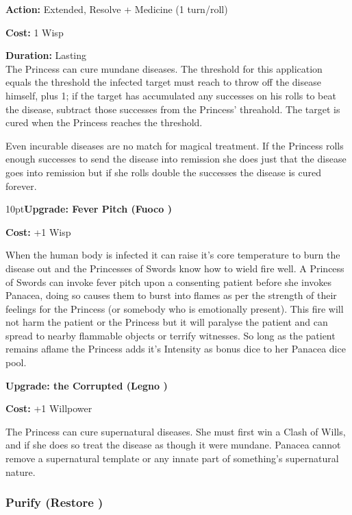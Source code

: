 \noindent \textbf{Action:} Extended, Resolve + Medicine (1 turn/roll)

\noindent \textbf{Cost:} 1 Wisp

\noindent \textbf{Duration:} Lasting \\

\noindent The Princess can cure mundane diseases. The threshold for this application equals the threshold the infected target must reach to throw off the disease himself, plus 1; if the target has accumulated any successes on his rolls to beat the disease, subtract those successes from the Princess' threahold. The target is cured when the Princess reaches the threshold.

Even incurable diseases are no match for magical treatment. If the Princess rolls enough successes to send the disease into remission she does just that \textemdash the disease goes into remission \textemdash but if she rolls double the successes the disease is cured forever. 

\begin{myindentpar}{10pt}\textbf{Upgrade: Fever Pitch (Fuoco \textbullet\textbullet)}

\noindent \textbf{Cost:} +1 Wisp

When the human body is infected it can raise it's core temperature to burn the disease out and the Princesses of Swords know how to wield fire well. A Princess of Swords can invoke fever pitch upon a consenting patient before she invokes Panacea, doing so causes them to burst into flames as per the strength of their feelings for the Princess (or somebody who is emotionally present). This fire will not harm the patient or the Princess but it will paralyse the patient and can spread to nearby flammable objects or terrify witnesses. So long as the patient remains aflame the Princess adds it's Intensity as bonus dice to her Panacea dice pool. 

\textbf{Upgrade: the Corrupted (Legno  \textbullet\textbullet\textbullet)}

\noindent \textbf{Cost:} +1 Willpower

The Princess can cure supernatural diseases.  She must first win a Clash of Wills, and if she does so treat the disease as though it were mundane. Panacea cannot remove a supernatural template or any innate part of something's supernatural nature.\end{myindentpar}

\subsubsection*{Purify (Restore \textbullet\textbullet)}

